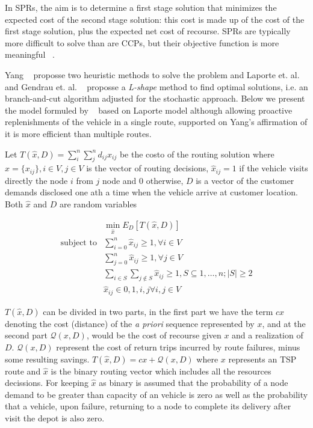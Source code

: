 In SPRs, the aim is to determine a first stage solution that minimizes the expected cost of the second stage solution: this cost is made up of the cost of the first stage solution, plus the expected net cost of recourse. SPRs are typically more difficult to solve than are CCPs, but their objective function is more meaningful ~\cite{gendreau_stochastic_1996}.


Yang ~\cite{yang_stochastic_2000} proposse two heuristic methods to solve the problem and Laporte et. al. ~\cite{laporte_integer_2002} and Gendrau et. al. ~\cite{gendreau_exact_1995} proposse a \textit{L-shape} method to find optimal solutions, i.e. an branch-and-cut algorithm adjusted for the stochastic approach. Below we present the model formuled by ~\cite{Dror_2005} based on Laporte model although allowing proactive replenishments of the vehicle in a single route, supported on Yang's affirmation of it is more efficient than multiple routes.

Let $T(\hat{x},D) =\sum_i^n\sum_j^nd_{ij}x_{ij}$ be the costo of the routing solution where $\hat{x}=\{x_{ij}\},i\in V,j\in V$ is the vector of routing decisions, $\hat{x}_{ij} =1$ if the vehicle visits directly the node $i$ from $j$ node and $0$ otherwise, $D$ is a vector of the customer demands disclosed one ath a time when the vehicle arrive at customer location. Both $\hat{x}$ and $D$ are random variables

\begin{align}\label{eq:SPR}
  & \min\limits_{\hat{x}} E_D[T(\hat{x},D)]\\ 
 \text{subject to} & \sum_{i=0}^n\hat{x}_{ij} \geq 1, \forall i \in V\\
  & \sum_{j=0}^n\hat{x}_{ij} \geq 1, \forall j \in V\\
  & \sum_{i\in S}\sum_{j\notin S}\hat{x}_{ij} \geq 1, S\subseteq {1,\ldots,n};|S|\geq2\\
  & \hat{x}_{ij} \in {0,1}, i,j \forall i,j \in V
\end{align}

$T(\hat{x},D)$ can be divided in two parts, in the first part we have the term $cx$ denoting the cost (distance) of the \textit{a priori} sequence represented by $x$, and at the second part $\mathcal{Q}(x,D)$, would be the cost of recourse given $x$ and a realization of $D$. $\mathcal{Q}(x,D)$ represent the cost of return trips incurred by route failures, minus some resulting savings.
$T(\hat{x},D) = cx+\mathcal{Q}(x,D)$ where $x$ represents an TSP route and $\hat{x}$ is the binary routing vector which includes all the resources decissions. For keeping $\hat{x}$ as binary is assumed that the probability of a node demand to be greater than capacity of an vehicle is zero as well as the probability that a vehicle, upon failure, returning to a node to complete its delivery after visit the depot is also zero.

